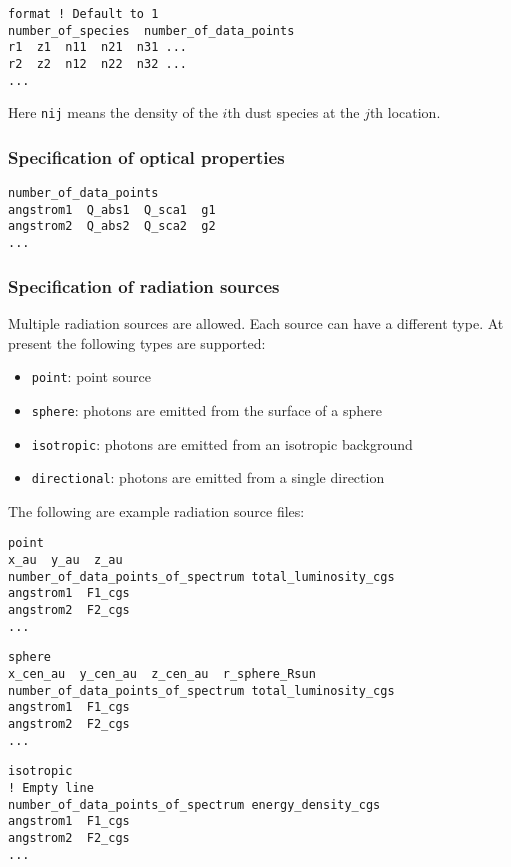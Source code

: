\documentclass{article}
\newcommand{\cds}[1]{\texttt{#1}}
\begin{document}
\begin{lstlisting}
format ! Default to 1
number_of_species  number_of_data_points
r1  z1  n11  n21  n31 ...
r2  z2  n12  n22  n32 ...
...
\end{lstlisting}
Here \cds{nij} means the density of the \(i\)th dust species at the \(j\)th location.

\subsubsection{Specification of optical properties}

\begin{lstlisting}
number_of_data_points
angstrom1  Q_abs1  Q_sca1  g1
angstrom2  Q_abs2  Q_sca2  g2
...
\end{lstlisting}

\subsubsection{Specification of radiation sources}

Multiple radiation sources are allowed.  Each source can have a different type.  At present the following types are supported:
\begin{itemize}
  \item \cds{point}: point source
  \item \cds{sphere}: photons are emitted from the surface of a sphere
  \item \cds{isotropic}: photons are emitted from an isotropic background
  \item \cds{directional}: photons are emitted from a single direction
\end{itemize}
The following are example radiation source files:

\begin{lstlisting}
point
x_au  y_au  z_au
number_of_data_points_of_spectrum total_luminosity_cgs
angstrom1  F1_cgs
angstrom2  F2_cgs
...
\end{lstlisting}

\begin{lstlisting}
sphere
x_cen_au  y_cen_au  z_cen_au  r_sphere_Rsun
number_of_data_points_of_spectrum total_luminosity_cgs
angstrom1  F1_cgs
angstrom2  F2_cgs
...
\end{lstlisting}

\begin{lstlisting}
isotropic
! Empty line
number_of_data_points_of_spectrum energy_density_cgs
angstrom1  F1_cgs
angstrom2  F2_cgs
...
\end{lstlisting}
\end{document}
